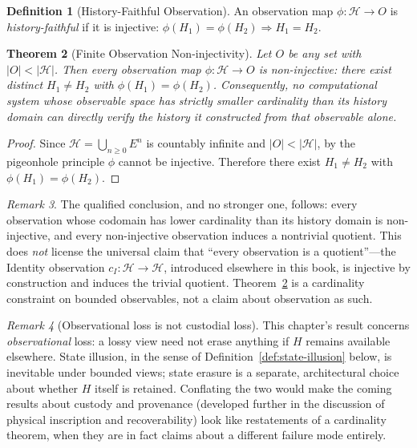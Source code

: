 \documentclass[12pt, a4paper, openany]{book}
\theoremstyle{plain}
\newtheorem{theorem}{Theorem}[chapter]
\theoremstyle{definition}
\newtheorem{definition}[theorem]{Definition}
\theoremstyle{remark}
\newtheorem{remark}[theorem]{Remark}
\newcommand{\calH}{\mathcal{H}}
\begin{document}
\begin{definition}[History-Faithful Observation]
An observation map $\phi : \calH \to O$ is \emph{history-faithful} if it is
injective: $\phi(H_1) = \phi(H_2) \Rightarrow H_1 = H_2$.
\end{definition}

\begin{theorem}[Finite Observation Non-injectivity]
\label{thm:no-direct-observation}
Let $O$ be any set with $|O| < |\calH|$. Then every observation map
$\phi : \calH \to O$ is non-injective: there exist distinct $H_1 \neq H_2$ with
$\phi(H_1) = \phi(H_2)$. Consequently, no computational system whose observable
space has strictly smaller cardinality than its history domain can directly
verify the history it constructed from that observable alone.
\end{theorem}

\begin{proof}
Since $\calH = \bigcup_{n \geq 0} E^n$ is countably infinite and $|O| < |\calH|$,
by the pigeonhole principle $\phi$ cannot be injective. Therefore there exist
$H_1 \neq H_2$ with $\phi(H_1) = \phi(H_2)$.
\end{proof}

\begin{remark}
The qualified conclusion, and no stronger one, follows: every observation whose
codomain has lower cardinality than its history domain is non-injective, and
every non-injective observation induces a nontrivial quotient. This does
\emph{not} license the universal claim that ``every observation is a
quotient''---the Identity observation $c_I : \calH \to \calH$, introduced
elsewhere in this book, is injective by construction and induces the trivial
quotient. Theorem~\ref{thm:no-direct-observation} is a cardinality constraint on
bounded observables, not a claim about observation as such.
\end{remark}

\begin{remark}[Observational loss is not custodial loss]
This chapter's result concerns \emph{observational} loss: a lossy view need not
erase anything if $H$ remains available elsewhere. State illusion, in the sense
of Definition~\ref{def:state-illusion} below, is inevitable under bounded views;
state erasure is a separate, architectural choice about whether $H$ itself is
retained. Conflating the two would make the coming results about custody and
provenance (developed further in the discussion of physical inscription and
recoverability) look like restatements of a cardinality theorem, when they are
in fact claims about a different failure mode entirely.
\end{remark}
\end{document}
